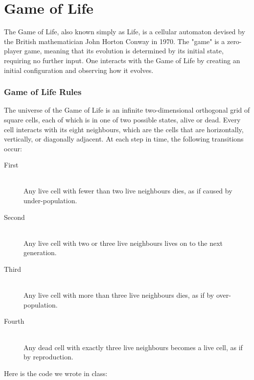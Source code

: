 
\chapter {Game of Life}

The Game of Life, also known simply as Life, is a cellular automaton devised by the British mathematician John Horton Conway in 1970.
The "game" is a zero-player game, meaning that its evolution is determined by its initial state, requiring no further input. One interacts with the Game of Life by creating an initial configuration and observing how it evolves.
\subsection{ Game of Life Rules}
The universe of the Game of Life is an infinite two-dimensional orthogonal grid of square cells, each of which is in one of two possible states, alive or dead. Every cell interacts with its eight neighbours, which are the cells that are horizontally, vertically, or diagonally adjacent. At each step in time, the following transitions occur:
\begin{description}
  \item[First] \hfill \\
  Any live cell with fewer than two live neighbours dies, as if caused by under-population.
  \item[Second] \hfill \\
  Any live cell with two or three live neighbours lives on to the next generation.
  \item[Third] \hfill \\
  Any live cell with more than three live neighbours dies, as if by over-population.
  \item[Fourth] \hfill \\
  Any dead cell with exactly three live neighbours becomes a live cell, as if by reproduction.
  
\end{description}
 Here is the code we wrote in class: \hfill
